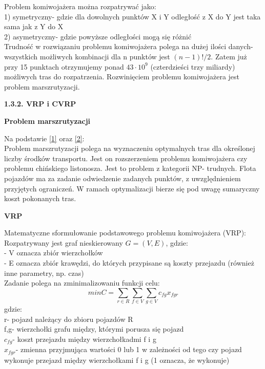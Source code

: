 \documentclass[a4paper, twoside, 12pt, justified]{article}
\begin{document}
	
	
	Problem komiwojażera można rozpatrywać jako:\\
	1) symetryczny- gdzie dla dowolnych punktów X i Y odległość z X do Y jest taka sama jak z Y do X\\
	2) asymetryczny- gdzie powyższe odległości mogą się różnić\\
	
	Trudność w rozwiązaniu problemu komiwojażera polega na dużej ilości danych- wszystkich możliwych kombinacji dla n punktów jest $(n-1)!/2$. Zatem już przy 15 punktach otrzymujemy ponad $43\cdot10^9$ (czterdzieści trzy miliardy) możliwych tras do rozpatrzenia. Rozwinięciem problemu komiwojażera jest problem marszrutyzacji.\newpage
	
	\begin{large}
		\textbf{1.3.2. VRP i CVRP}
	\end{large}
	
	\begin{large}
		\begin{center}
			\textbf{Problem marszrutyzacji}
		\end{center}
	\end{large}

	Na podstawie \hyperlink{vrp}{[1]} oraz \hyperlink{cvrp}{[2]}:\\
	Problem marszrutyzacji polega na wyznaczeniu optymalnych tras dla określonej liczby środków transportu. Jest on rozszerzeniem problemu komiwojażera czy problemu chińskiego listonosza. Jest to problem z kategorii NP- trudnych. Flota pojazdów ma za zadanie odwiedzenie zadanych punktów, z uwzględnieniem przyjętych ograniczeń. W ramach optymalizacji bierze się pod uwagę sumaryczny koszt pokonanych tras. \\
	
	\begin{large}
		\begin{center}
			\textbf{VRP}
		\end{center}
	\end{large} 

	Matematyczne sformułowanie podstawowego problemu komiwojażera (VRP):\\
	Rozpatrywany jest graf nieskierowany $G=(V,E)$, gdzie:\\
	- V oznacza zbiór wierzchołków\\ 
	- E oznacza zbiór krawędzi, do których przypisane są koszty przejazdu (również inne parametry, np. czas)
	\\
	Zadanie polega na zminimalizowaniu funkcji celu:
	\begin{equation}
	{minC=\sum\limits_{r \in R}\sum\limits_{f \in V}\sum\limits_{g \in V}}c_{fg}x_{fgr}
	\end{equation}
	gdzie:\\
	r- pojazd należący do zbioru pojazdów R\\
	f,g- wierzchołki grafu między, którymi porusza się pojazd\\
	$c_{fg}$- koszt przejazdu między wierzchołkadmi f i g\\
	$x_{fgr}$- zmienna przyjmująca wartości 0 lub 1 w zależności od tego czy pojazd wykonuje przejazd między wierzchołkami f i g (1 oznacza, że wykonuje) \\
	
\end{document}
